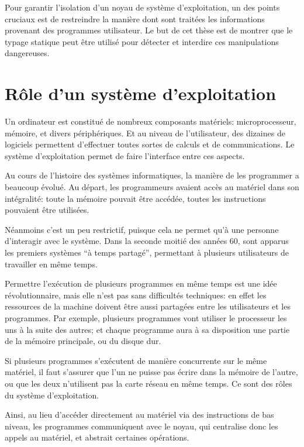 Pour garantir l'isolation d'un noyau de système d'exploitation, un des points
cruciaux est de restreindre la manière dont sont traitées les informations
provenant des programmes utilisateur. Le but de cet thèse est de montrer que le
typage statique peut être utilisé pour détecter et interdire ces manipulations
dangereuses.

\section{Rôle d'un système d'exploitation}

Un ordinateur est constitué de nombreux composants matériels: microprocesseur,
mémoire, et divers périphériques. Et au niveau de l'utilisateur, des dizaines de
logiciels permettent d'effectuer toutes sortes de calculs et de communications.
Le système d'exploitation permet de faire l'interface entre ces aspects.

Au cours de l'histoire des systèmes informatiques, la manière de les programmer
a beaucoup évolué. Au départ, les programmeurs avaient accès au matériel dans
son intégralité: toute la mémoire pouvait être accédée, toutes les instructions
pouvaient être utilisées.

Néanmoins c'est un peu restrictif, puisque cela ne permet qu'à une personne
d'interagir avec le système. Dans la seconde moitié des années 60, sont apparus
les premiers systèmes ``à temps partagé'', permettant à plusieurs utilisateurs
de travailler en même temps.

Permettre l'exécution de plusieurs programmes en même temps est une idée
révolutionnaire, mais elle n'est pas sans difficultés techniques: en effet les
ressources de la machine doivent être aussi partagées entre les utilisateurs et
les programmes. Par exemple, plusieurs programmes vont utiliser le processeur
les uns à la suite des autres; et chaque programme aura à sa disposition une
partie de la mémoire principale, ou du disque dur.

Si plusieurs programmes s'exécutent de manière concurrente sur le même matériel,
il faut s'assurer que l'un ne puisse pas écrire dans la mémoire de l'autre, ou
que les deux n'utilisent pas la carte réseau en même temps. Ce sont des rôles du
système d'exploitation.

Ainsi, au lieu d'accéder directement au matériel via des instructions de bas
niveau, les programmes communiquent avec le noyau, qui centralise donc les
appels au matériel, et abstrait certaines opérations.

